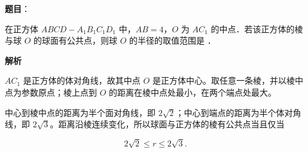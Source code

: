 \begin{answer}

\textbf{题目}：

在正方体 $ABCD-A_1B_1C_1D_1$ 中，$AB=4$，$O$ 为 $AC_1$ 的中点．若该正方体的棱与球 $O$ 的球面有公共点，则球 $O$ 的半径的取值范围是 \gkblank{}．

\textbf{解析}

$AC_1$ 是正方体的体对角线，故其中点 $O$ 是正方体中心。取任意一条棱，并以棱中点为参数原点；棱上点到 $O$ 的距离在棱中点处最小，在两个端点处最大。

中心到棱中点的距离为半个面对角线，即 $2\sqrt2$；中心到端点的距离为半个体对角线，即 $2\sqrt3$。距离沿棱连续变化，所以球面与正方体的棱有公共点当且仅当

\nopagebreak[4]
\[
2\sqrt2\leqslant r\leqslant2\sqrt3.
\]


\par\medskip

\end{answer}

